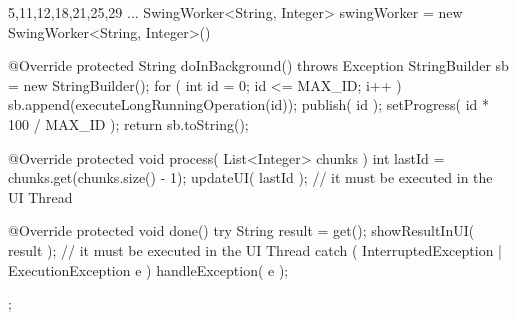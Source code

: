 \begin{javacode}{5,11,12,18,21,25,29}
...
SwingWorker<String, Integer> swingWorker = new SwingWorker<String, Integer>()
{
	@Override
	protected String doInBackground() throws Exception
	{
		StringBuilder sb = new StringBuilder();
		for ( int id = 0; id <= MAX_ID; i++ )
		{
			sb.append(executeLongRunningOperation(id));
			publish( id );
			setProgress( id * 100 / MAX_ID );
		}
		return sb.toString();
	}

	@Override
	protected void process( List<Integer> chunks )
	{
		int lastId = chunks.get(chunks.size() - 1);
		updateUI( lastId ); // it must be executed in the UI Thread
	}

	@Override
	protected void done()
	{
		try
		{
			String result = get();
			showResultInUI( result );  // it must be executed in the UI Thread
		}
		catch ( InterruptedException | ExecutionException e )
		{
			handleException( e );
		}
	}
};
\end{javacode}
